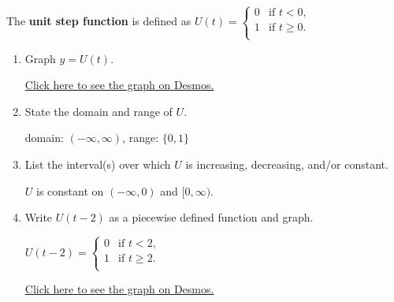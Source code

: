 \documentclass{ximera}
\begin{document}
\begin{problem}\label{unitstepexercise}
The \textbf{unit step function} is defined as $U(t) = \begin{cases}
    0 &  \text{if $t<0$, } \\
    1  & \text{if $t \geq 0$.} \\
   \end{cases}$

\begin{enumerate}

\item  Graph $y = U(t)$.

\href{https://www.desmos.com/calculator/qfk1m5krp9}{Click here to see the graph on Desmos.}

\item  State the domain and range of $U$.

\begin{solution}
domain: $(-\infty, \infty)$, range:  $\{ 0, 1\}$
\end{solution}

\item  List the interval(s) over which $U$ is increasing, decreasing, and/or constant.

\begin{solution}
$U$ is constant on $(-\infty, 0)$ and $[0, \infty)$.
\end{solution}

\item  Write $U(t-2)$ as a piecewise defined function and graph.

 $U(t-2) = \begin{cases}
    0 &  \text{if $t<2$, } \\
    1  & \text{if $t \geq 2$.} \\
   \end{cases}$

\href{https://www.desmos.com/calculator/7frkwxnzzv}{Click here to see the graph on Desmos.}

\end{enumerate}
    
\end{problem}   
\end{document}
